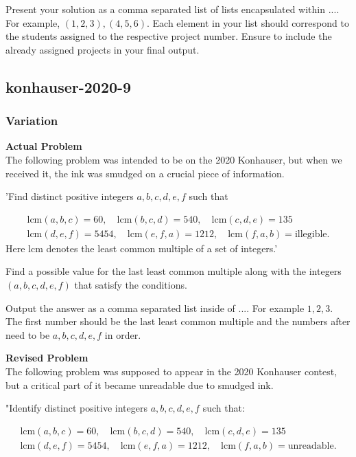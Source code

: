 Present your solution as a comma separated list of lists encapsulated within $\boxed{...}$. For example, $\boxed{(1,2,3),(4,5,6)}$. Each element in your list should correspond to the students assigned to the respective project number. Ensure to include the already assigned projects in your final output.

\subsection{konhauser-2020-9}
\subsubsection{Variation}
\textbf{Actual Problem}\\
The following problem was intended to be on the 2020 Konhauser, but when we received it, the ink was smudged on a crucial piece of information.

'Find distinct positive integers $a, b, c, d, e, f$ such that

$$
\begin{aligned}
 \text{lcm}(a, b, c) = 60, \quad \text{lcm}(b, c, d) = 540, \quad \text{lcm}(c, d, e) = 135 \\
   \text{lcm}(d, e, f) = 5454, \quad \text{lcm}(e, f, a) = 1212, \quad \text{lcm}(f, a, b) = \text{illegible}.
\end{aligned}
$$
Here lcm denotes the least common multiple of a set of integers.'

Find a possible value for the last least common multiple along with the integers $(a,b,c,d,e,f)$ that satisfy the conditions.

Output the answer as a comma separated list inside of $\boxed{...}$. For example $\boxed{1, 2, 3}$.
The first number should be the last least common multiple and the numbers after need to be $a,b,c,d,e,f$ in order.

\textbf{Revised Problem}\\
The following problem was supposed to appear in the 2020 Konhauser contest, but a critical part of it became unreadable due to smudged ink.

"Identify distinct positive integers $a, b, c, d, e, f$ such that:

$$
\begin{aligned}
 \text{lcm}(a, b, c) = 60, \quad \text{lcm}(b, c, d) = 540, \quad \text{lcm}(c, d, e) = 135 \\
   \text{lcm}(d, e, f) = 5454, \quad \text{lcm}(e, f, a) = 1212, \quad \text{lcm}(f, a, b) = \text{unreadable}.
\end{aligned}
$$

